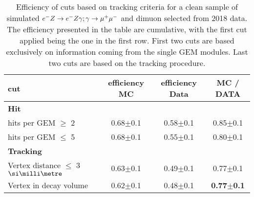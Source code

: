 \begin{center}
\begin{table}
  \begin{tabular}{|l|c|c|c|}
    \hline
    cut & efficiency MC & efficiency Data & MC / DATA \\
    \hline
    \multicolumn{4}{|l|}{\textbf{Hit}}\\
    \hline
    hits per GEM $\geq$ 2 & 0.68$\pm$0.1 & 0.58$\pm$0.1 & 0.85$\pm$0.1 \\
    hits per GEM $\leq$ 5 & 0.68$\pm$0.1 & 0.55$\pm$0.1 & 0.80$\pm$0.1 \\
    \hline
    \multicolumn{4}{|l|}{\textbf{Tracking}}\\    
    \hline
    Vertex distance $\leq$ 3 $\mmi$ & 0.63$\pm$0.1 & 0.49$\pm$0.1 & 0.77$\pm$0.1  \\
    Vertex in decay volume & 0.62$\pm$0.1 & 0.48$\pm$0.1 & \textbf{0.77$\pm$0.1}\\
    \hline
    
  \end{tabular}
  \caption[MC/DATA for the tracking procedure and vertex reconstruction]{Efficiency of cuts based on tracking criteria for a clean sample of simulated $e^- Z \to e^- Z \gamma; \gamma \to \mu^+ \mu^-$ and dimuon selected from 2018 data. The efficiency presented in the table are cumulative, with the first cut applied being the one in the first row. First two cuts are based exclusively on information coming from the single GEM modules. Last two cuts are based on the tracking procedure.}
  \label{tab:dimuon:efficiencies}
\end{table}
\end{center}

